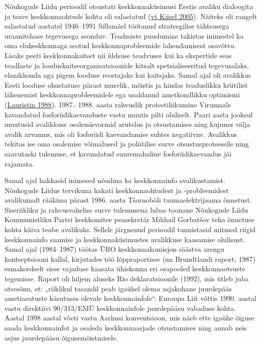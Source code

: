 \documentclass[estonian,]{article}
\begin{document}
Nõukogude Liidu perioodil otsustati keskkonnaküsimusi Eestis avaliku dialoogita ja teave keskkonnaohtude kohta oli salastatud (\protect\hyperlink{Kiisel2005}{vt Kiisel 2005}). Näiteks oli rangelt salastatud aastatel 1946--1991 Sillamäel töötanud strateegilise tähtsusega uraanitehase tegevusega seonduv. Teadmiste puudumine takistas inimestel ka oma elukeskkonnaga seotud keskkonnaprobleemide lahendamisest osavõttu. Lisaks peeti keskkonnakaitset nii üldsuse teadvuses kui ka ekspertide seas teadlaste ja looduskaitseorganisatsioonide kitsalt spetsialiseeritud tegevusalaks, elanikkonda aga pigem looduse reostajaks kui kaitsjaks. Samal ajal oli avalikkus Eesti looduse ohustatuse pärast murelik, mõistis ja hindas teaduslikku kriitilist lähenemist keskkonnaprobleemidele ega usaldanud ametkondlikku optimismi (\protect\hyperlink{Lauristin1988}{Lauristin 1988}).
1987.--1988. aasta rahvuslik protestiliikumine Virumaale kavandatud fosforiidikaevanduste vastu muutis pilti oluliselt. Paari aasta jooksul muutusid avalikkuse osalemisvormid arutelus ja otsustamises ning kujunes välja avalik arvamus, mis oli fosforiidi kaevandamise suhtes negatiivne. Avalikkus tekitas ise oma osalemise võimalused ja poliitilise surve otsustusprotsessile ning saavutaski tulemuse, et kavandatud suuremahuline fosforiidikaevandus jäi rajamata.

Samal ajal hakkasid inimesed nõudma ka keskkonnainfo avalikustamist. Nõukogude Liidus tervikuna hakati keskkonnaohtudest ja -probleemidest avalikumalt rääkima pärast 1986. aasta Tšornobõli tuumaelektrijaama õnnetust. Siseriikliku ja rahvusvahelise surve tulemusena lubas toonane Nõukogude Liidu Kommunistliku Partei keskkomitee peasekretär Mihhail Gorbatšov teha õnnetuse kohta käiva teabe avalikuks. Sellele järgnenud perioodil tunnistasid mitmed riigid keskkonnainfo saamise ja keskkonnaküsimustes avalikkuse kaasamise olulisust. Samal ajal (1984--1987) töötas ÜRO keskkonnakomisjon säästva arengu kontseptsiooni kallal, kirjutades töö lõppraportisse (nn Brundtlandi raport; 1987) esmakordselt sisse vajaduse kaasata ühiskonna eri osapooled keskkonnaotsuste tegemisse. Raport oli hiljem aluseks Rio deklaratsioonile (1992), mis ütleb juba otsesõnu, et: „riiklikul tasandil peab igaühel olema asjakohane juurdepääs ametiasutuste käsutuses olevale keskkonnainfole``. Euroopa Liit võttis 1990. aastal vastu direktiivi 90/313/EMÜ keskkonnainfole juurdepääsu vabaduse kohta. Aastal 1998 aastal võeti vastu Aarhusi konventsioon, mis näeb ette igaühe õiguse saada keskkonnainfot ja osaleda keskkonnaasjade otsustamises ning annab neis asjus juurdepääsu õigusemõistmisele.
\end{document}
